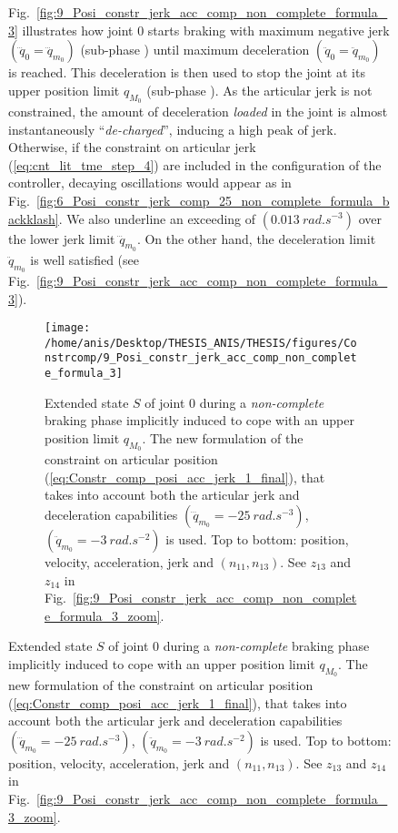 \begin{figure}[!htbp]
Fig.~\ref{fig:9_Posi_constr_jerk_acc_comp_non_complete_formula_3} illustrates how joint $0$ starts braking with maximum negative jerk $(\dddot{q}_{0} = \dddot{q}_{m_{0}})$ (sub-phase ) until maximum deceleration $(\ddot{q}_{0} = \ddot{q}_{m_{0}})$ is reached. This deceleration is then used to stop the joint at its upper position limit $q_{M_{0}}$ (sub-phase ). As the articular jerk is not constrained, the amount of deceleration \textit{loaded} in the joint is almost instantaneously ``\textit{de-charged}'', inducing a high peak of jerk. Otherwise, if the constraint on articular jerk (\ref{eq:cnt_lit_tme_step_4}) are included in the configuration of the controller, decaying oscillations would appear as in Fig.~\ref{fig:6_Posi_constr_jerk_comp_25_non_complete_formula_backklash}. We also underline an exceeding of $(0.013~rad.s^{-3})$ over the lower jerk limit $\dddot{q}_{m_{0}}$. On the other hand, the deceleration limit $\ddot{q}_{m_{0}}$ is well satisfied (see Fig.~\ref{fig:9_Posi_constr_jerk_acc_comp_non_complete_formula_3}).
\begin{figure}[!htbp]
\centering
\texttt{[image: /home/anis/Desktop/THESIS\_ANIS/THESIS/figures/Constrcomp/9\_Posi\_constr\_jerk\_acc\_comp\_non\_complete\_formula\_3]}
\caption{Extended state $S$ of joint $0$ during a \textit{non-complete} braking phase implicitly induced to cope with an upper position limit $q_{M_{0}}$. The new formulation of the constraint on articular position (\ref{eq:Constr_comp_posi_acc_jerk_1_final}), that takes into account both the articular jerk and deceleration capabilities $(\dddot{q}_{m_{0}} = -25~rad.s^{-3})$, $(\ddot{q}_{m_{0}}= -3~rad.s^{-2})$ is used. Top to bottom: position, velocity, acceleration, jerk and $(n_{11}, n_{13})$. See $z_{13}$ and $z_{14}$ in Fig.~\ref{fig:9_Posi_constr_jerk_acc_comp_non_complete_formula_3_zoom}.} 

\end{figure}
\end{figure}
